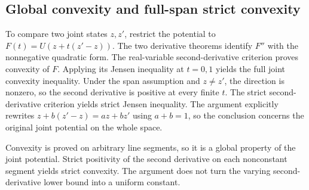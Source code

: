 \documentclass[11pt,a4paper]{report}
\begin{document}
\subsection{\texorpdfstring{Global convexity and full-span strict convexity}{Global convexity and full-span strict convexity}}
\label{report-step-KIPLMC-LogisticExample-lean-4}


To compare two joint states \(z,z'\), restrict the potential to \(F(t)=U(z+t(z'-z))\). The two derivative theorems identify \(F''\) with the nonnegative quadratic form. The real-variable second-derivative criterion proves convexity of \(F\). Applying its Jensen inequality at \(t=0,1\) yields the full joint convexity inequality. Under the span assumption and \(z\ne z'\), the direction is nonzero, so the second derivative is positive at every finite \(t\). The strict second-derivative criterion yields strict Jensen inequality. The argument explicitly rewrites \(z+b(z'-z)=az+bz'\) using \(a+b=1\), so the conclusion concerns the original joint potential on the whole space.



Convexity is proved on arbitrary line segments, so it is a global property of the joint potential. Strict positivity of the second derivative on each nonconstant segment yields strict convexity. The argument does not turn the varying second-derivative lower bound into a uniform constant.
\end{document}
